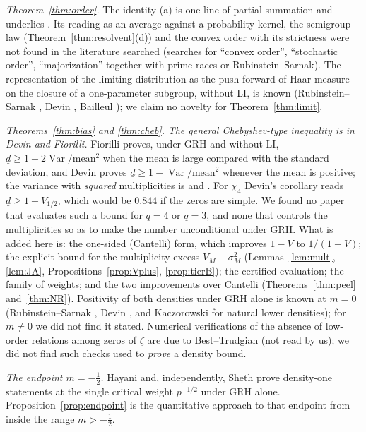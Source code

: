 \documentclass[11pt]{amsart}
\theoremstyle{definition}
\numberwithin{equation}{section}
\newcommand{\dlow}{\underline{d}}
\begin{document}
\emph{Theorem~\ref{thm:order}.} The identity (a) is one line of
partial summation and underlies \cite[Theorem~A]{MC}. Its reading as
an average against a probability kernel, the semigroup law
(Theorem~\ref{thm:resolvent}(d)) and the convex order with its
strictness were not found in the literature searched (searches for
``convex order'', ``stochastic order'', ``majorization'' together
with prime races or Rubinstein--Sarnak). The representation of the
limiting distribution as the push-forward of Haar measure on the
closure of a one-parameter subgroup, without LI, is known
(Rubinstein--Sarnak \cite[\S2]{RS94}, Devin \cite[\S4]{Dev20},
Bailleul \cite{Bai21}); we claim no novelty for
Theorem~\ref{thm:limit}.

\emph{Theorems~\ref{thm:bias} and \ref{thm:cheb}.} \emph{The general
Chebyshev-type inequality is in Devin and Fiorilli.} Fiorilli
\cite[Lemma~2.7]{Fio14} proves, under GRH and without LI,
$\dlow\ge1-2\operatorname{Var}/\mathrm{mean}^2$ when the mean is large
compared with the standard deviation, and Devin
\cite[Corollary~5.8]{Dev20} proves $\dlow\ge1-\operatorname{Var}/
\mathrm{mean}^2$ whenever the mean is positive; the variance with
\emph{squared} multiplicities is \cite[Lemma~2.5]{Fio14} and
\cite[Theorem~2.1]{Dev20}. For $\chi_4$ Devin's corollary reads
$\dlow\ge1-V_{1/2}$, which would be $0.844$ if the zeros are simple.
We found no paper that evaluates such a bound for $q=4$ or $q=3$, and
none that controls the multiplicities so as to make the number
unconditional under GRH. What is added here is: the one-sided
(Cantelli) form, which improves $1-V$ to $1/(1+V)$; the explicit
bound for the multiplicity excess $V_M-\sigma_M^2$
(Lemmas~\ref{lem:mult}, \ref{lem:JA},
Propositions~\ref{prop:Vplus}, \ref{prop:tierB}); the certified
evaluation; the family of weights; and the two improvements over
Cantelli (Theorems~\ref{thm:peel} and~\ref{thm:NR}). Positivity of
both densities under GRH alone is known at $m=0$
(Rubinstein--Sarnak \cite[Theorem~1.2]{RS94}, Devin
\cite[Theorem~2.5(1)]{Dev20}, and Kaczorowski \cite{Kac93} for
natural lower densities); for $m\ne0$ we did not find it stated.
Numerical verifications of the absence of low-order relations among
zeros of $\zeta$ are due to Best--Trudgian \cite{BT15} (not read by
us); we did not find such checks used to \emph{prove} a density
bound.

\emph{The endpoint $m=-\tfrac12$.} Hayani \cite{Hay25} and,
independently, Sheth \cite{Sheth24} prove density-one statements at
the single critical weight $p^{-1/2}$ under GRH alone.
Proposition~\ref{prop:endpoint} is the quantitative approach to that
endpoint from inside the range $m>-\tfrac12$.
\end{document}
